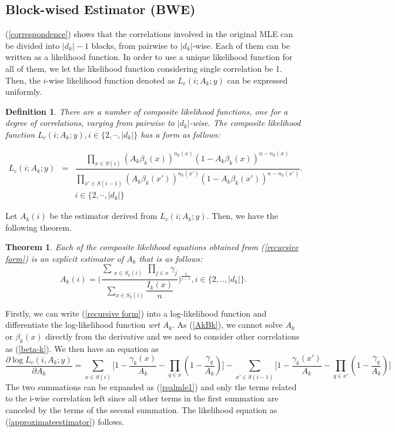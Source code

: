 \documentclass[10pt,onecolumn]{IEEEtran}
\newtheorem{definition}{\bf Definition}
\newtheorem{theorem}{\bf Theorem}
\begin{document}
\subsection{Block-wised Estimator (BWE)}


(\ref{correspondence}) shows that the correlations involved in the original MLE can be divided into $|d_k|-1$ blocks, from pairwise to $|d_k|$-wise.  Each of them can be written as a likelihood function. In order to use a unique likelihood function for all of them, we let the likelihood function considering single correlation be 1. Then, the $i$-wise likelihood function denoted as $L_c(i; A_k; y)$ can be expressed uniformly.



\begin{definition} \label{recursive corollary}
There are a number of composite likelihood functions, one for a degree of correlations, varying from pairwise to $|d_k|$-wise. The composite likelihood function  $L_c(i; A_k; y), i \in \{2,\cdot\cdot, |d_k|\}$ has a  form as follows:

\begin{eqnarray}
L_c(i; A_k; y) &=&\dfrac{\prod_{x \in S(i)} (A_k\beta_k(x))^{n_k(x)}(1-A_k\beta_k(x))^{n-n_k(x)}}{\prod_{x' \in S(i-1)}(A_k\beta_k(x'))^{n_k(x')}(1-A_k\beta_k(x'))^{n-n_k(x')}}. \nonumber \\
&& i \in \{2,\cdot\cdot,|d_k|\}
\label{recursive form}
\end{eqnarray}
 \end{definition}
 Let $A_k(i)$ be the estimator derived from $L_c(i; A_k; y)$. Then,  we have the following theorem.
\begin{theorem} \label{all explicit}
Each of the composite likelihood
equations obtained from (\ref{recursive form}) is an explicit estimator of $A_k$ that is as follows:
\begin{equation}
A_k(i)=\Big (\dfrac{\sum_{\substack{ x \in S_k(i)}}
\prod_{j \in x} \gamma_j}{\sum_{x \in S_k(i)}\dfrac{I_k(x)}{n}}{\Big )} ^{\frac{1}{i-1}},  i \in
\{2,.., |d_k|\}. \label{approximateestimator}
\end{equation}
\end{theorem}
\begin{IEEEproof}
Firstly, we can write (\ref{recursive form}) into a log-likelihood function and differentiate the log-likelihood function {\it wrt} $A_k$. As (\ref{AkBk}), we cannot solve $A_k$ or $\beta_k(x)$ directly from the derivative and we need to consider other correlations as (\ref{beta-k}). We then have an equation as
\begin{equation}
\frac{\partial\log L_c(i,A_k; y)}{\partial A_k}=\sum_{x \in
S(i)} \Big [1-\dfrac{\gamma_k(x)}{A_k}-\prod_{q\in x}(1-\dfrac{\gamma_q}{A_k})\Big ]-\sum_{x' \in S(i-1)} \Big [1-\dfrac{\gamma_k(x')}{A_k}-\prod_{q\in x'}(1-\dfrac{\gamma_q}{A_k})\Big ]
\label{pairwise equation}
\end{equation} The two summations can be expanded as (\ref{realmle1}) and only the terms related to the i-wise correlation left  since all other terms in the first summation are canceled by the terms of the second summation. The likelihood equation as (\ref{approximateestimator}) follows.
\end{IEEEproof}
\end{document}
